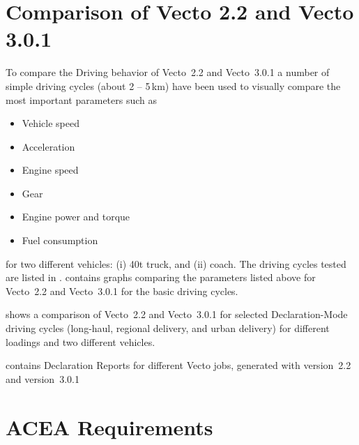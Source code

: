 
\section{Comparison of Vecto 2.2 and Vecto 3.0.1} %
\label{sec:comparison_of_vecto_2_2_and_vecto_3_0_1}

To compare the Driving behavior of Vecto~2.2 and Vecto~3.0.1 a number of simple driving cycles (about 2 -- 5\,km) have been used to visually compare the most important parameters such as 
\begin{itemize}
	\item Vehicle speed
	\item Acceleration
	\item Engine speed
	\item Gear
	\item Engine power and torque
	\item Fuel consumption
\end{itemize}
for two different vehicles: (i) 40t truck, and (ii) coach. The driving cycles tested are listed in .  contains graphs comparing the parameters listed above for Vecto~2.2 and Vecto~3.0.1 for the basic driving cycles.

 shows a comparison of Vecto~2.2 and Vecto~3.0.1 for selected Declaration-Mode driving cycles (long-haul, regional delivery, and urban delivery) for different loadings and two different vehicles.

 contains Declaration Reports for different Vecto jobs, generated with version~2.2 and version~3.0.1



\section{ACEA Requirements} %
\label{sec:subsection_name}


